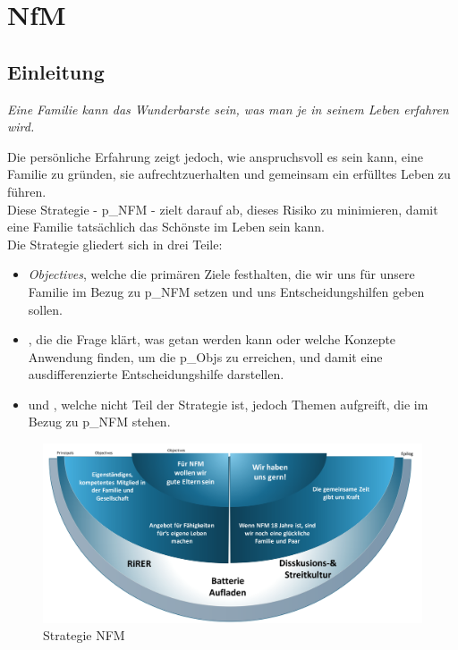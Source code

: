\chapter{NfM}
\setcounter{section}{0}


\section{Einleitung}
\begin{center}
	\textit{Eine Familie kann das Wunderbarste sein, was man je in seinem Leben erfahren wird.}
\end{center}

Die persönliche Erfahrung zeigt jedoch, wie anspruchsvoll es sein kann, eine Familie zu gründen, sie aufrechtzuerhalten und gemeinsam ein erfülltes Leben zu führen.\\

Diese Strategie - \gls{p_NFM} - zielt darauf ab, dieses Risiko zu minimieren, damit eine Familie tatsächlich das Schönste im Leben sein kann.\\

Die Strategie gliedert sich in drei Teile:
\begin{itemize}
	\item \textit{Objectives}, welche die primären Ziele festhalten, die wir uns für unsere Familie im Bezug zu \gls{p_NFM} setzen und uns Entscheidungshilfen geben sollen.
	\item \textit{}, die die Frage klärt, was getan werden kann oder welche Konzepte Anwendung finden, um die \glspl{p_Obj} zu erreichen, und damit eine ausdifferenzierte Entscheidungshilfe darstellen.
	\item und \textit{}, welche nicht Teil der Strategie ist, jedoch Themen aufgreift, die im Bezug zu \gls{p_NFM} stehen.
\end{itemize}

\begin{figure}[H]
	\centering
	\includegraphics[scale = 0.2]{attachment/chapter_OWN/Scc010.png}
	\caption{Strategie NFM}
\end{figure} 


